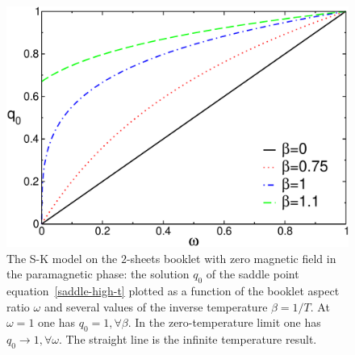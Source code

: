 \documentclass[twocolumn,superscriptaddress,prb,10pt]{revtex4-1}
\begin{document}
\begin{figure}[t]
\includegraphics*[width=0.9\linewidth]{./draft_figs/RSB0_saddle_ht}
\caption{
 The S-K model on the $2$-sheets booklet with zero magnetic field in the 
 paramagnetic phase: the solution $q_0$ of the saddle point 
 equation~\eqref{saddle-high-t} plotted as a function of the booklet aspect 
 ratio $\omega$ and several values of the inverse temperature $\beta=1/T$. 
 At $\omega=1$ one has $q_0=1,\forall\beta$. In the zero-temperature limit 
 one has $q_0\to 1,\forall\omega$. The straight line is the infinite 
 temperature result. 
}
\label{RSB0_saddle_ht}
\end{figure}
\end{document}

